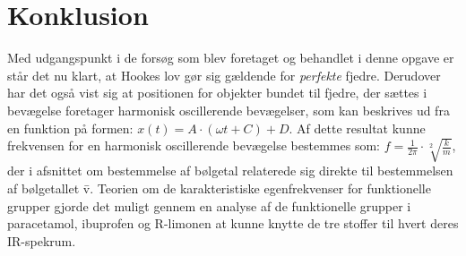 \section{Konklusion}
Med udgangspunkt i de forsøg som blev foretaget og behandlet i denne opgave er står det nu klart, at Hookes lov gør sig gældende for \emph{perfekte} fjedre. Derudover har det også vist sig at positionen for objekter bundet til fjedre, der sættes i bevægelse foretager harmonisk oscillerende bevægelser, som kan beskrives ud fra en funktion på formen: $x(t)=A \cdot (\omega t + C) + D$. Af dette resultat kunne frekvensen for en harmonisk oscillerende bevægelse bestemmes som: $f=\frac{1}{2\pi} \cdot \sqrt[2]{\frac{k}{m}}$, der i afsnittet om bestemmelse af bølgetal relaterede sig direkte til bestemmelsen af bølgetallet \={v}. Teorien om de karakteristiske egenfrekvenser for funktionelle grupper gjorde det muligt gennem en analyse af de funktionelle grupper i paracetamol, ibuprofen og R-limonen at kunne knytte de tre stoffer til hvert deres IR-spekrum. 
